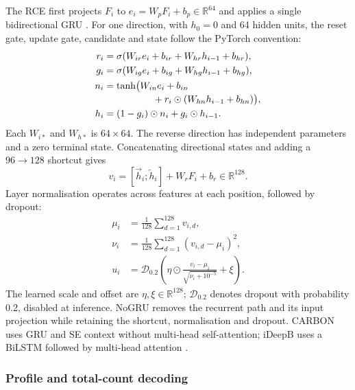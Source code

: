The RCE first projects $F_i$ to $e_i=W_pF_i+b_p\in\mathbb R^{64}$ and applies a single bidirectional GRU \citep{cho2014rnnencoder,schuster1997brnn}. For one direction, with $h_0=0$ and 64 hidden units, the reset gate, update gate, candidate and state follow the PyTorch convention:
\begin{align}
r_i&=\sigma(W_{ir}e_i+b_{ir}+W_{hr}h_{i-1}+b_{hr}),
\label{eq:gru_reset}\\
g_i&=\sigma(W_{ig}e_i+b_{ig}+W_{hg}h_{i-1}+b_{hg}),
\label{eq:gru_update}\\
n_i&=\tanh\!\big(W_{in}e_i+b_{in}
\nonumber\\[-2pt]
&\hspace{18mm}+r_i\odot(W_{hn}h_{i-1}+b_{hn})\big),
\label{eq:gru_candidate}\\
h_i&=(1-g_i)\odot n_i+g_i\odot h_{i-1}.
\label{eq:gru_state}
\end{align}
Each $W_{i*}$ and $W_{h*}$ is $64\times64$. The reverse direction has independent parameters and a zero terminal state. Concatenating directional states and adding a $96\rightarrow128$ shortcut gives
\begin{equation}
v_i=[\overrightarrow h_i;\overleftarrow h_i]+W_rF_i+b_r
\in\mathbb R^{128}.
\label{eq:bidirectional_sum}
\end{equation}
Layer normalisation \citep{ba2016layernorm} operates across features at each position, followed by dropout:
\begin{equation}
\begin{aligned}
\mu_i&=\frac1{128}\sum_{d=1}^{128}v_{i,d},\\
\nu_i&=\frac1{128}\sum_{d=1}^{128}(v_{i,d}-\mu_i)^2,\\
u_i&=\mathcal D_{0.2}\!\left(
\eta\odot\frac{v_i-\mu_i}{\sqrt{\nu_i+10^{-5}}}+\xi\right).
\end{aligned}
\label{eq:recurrent_residual}
\end{equation}
The learned scale and offset are $\eta,\xi\in\mathbb R^{128}$; $\mathcal D_{0.2}$ denotes dropout with probability 0.2, disabled at inference. NoGRU removes the recurrent path and its input projection while retaining the shortcut, normalisation and dropout. CARBON uses GRU and SE context without multi-head self-attention; iDeepB uses a BiLSTM followed by multi-head attention \citep{liu2025ideepb}.

\subsubsection{Profile and total-count decoding}

